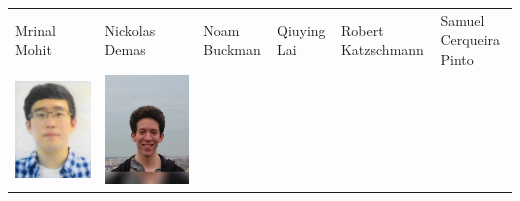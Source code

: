 \documentclass[landscape,a0paper,fontscale=0.292]{baposter}
\begin{document}
\begin{poster}
{\begin{center}
\begin{tabularx}{\linewidth}{X X X X X X}
{\tiny \centering Mrinal Mohit }& {\tiny \centering Nickolas Demas }& {\tiny \centering Noam Buckman }& {\tiny \centering Qiuying Lai }& {\tiny \centering Robert Katzschmann }& {\tiny \centering Samuel Cerqueira Pinto }\\ 
 {\centering \includegraphics[width=0.6\linewidth]{sang.jpg}}&
{\centering \includegraphics[width=0.6\linewidth]{teddy.jpg}}&

\end{tabularx}
\end{center}}
\end{poster}
\end{document}
